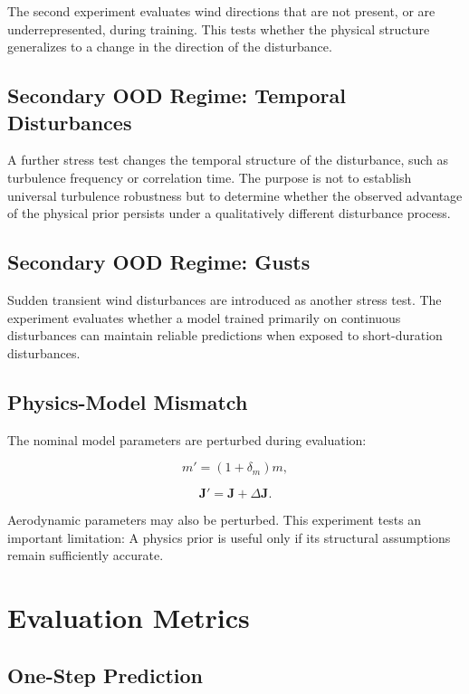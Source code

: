 \documentclass[conference]{IEEEtran}
\begin{document}
The second experiment evaluates wind directions that are not present, or are underrepresented, during training. This tests whether the physical structure generalizes to a change in
the direction of the disturbance.


\subsection{Secondary OOD Regime: Temporal Disturbances}

A further stress test changes the temporal structure of the disturbance, such as turbulence frequency or correlation time. The purpose is not to establish universal turbulence robustness but to determine whether the observed advantage of the physical prior persists under a qualitatively different disturbance process.


\subsection{Secondary OOD Regime: Gusts}

Sudden transient wind disturbances are introduced as another stress test. The experiment evaluates whether a model trained primarily on continuous disturbances can maintain reliable predictions when exposed
to short-duration disturbances.


\subsection{Physics-Model Mismatch}

The nominal model parameters are perturbed during evaluation:

\begin{equation}
m' = (1+\delta_m)m,
\end{equation}

\begin{equation}
\mathbf{J}'
=
\mathbf{J}
+
\Delta\mathbf{J}.
\end{equation}

Aerodynamic parameters may also be perturbed. This experiment tests an important limitation: A physics prior is useful only if its structural assumptions remain sufficiently accurate.


\section{Evaluation Metrics}


\subsection{One-Step Prediction}
\end{document}
